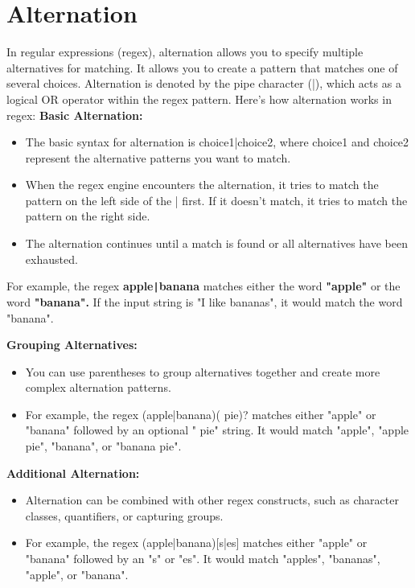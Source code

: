 \documentclass{report}
\begin{document}
    \section{Alternation}
    In regular expressions (regex), alternation allows you to specify multiple alternatives for matching. It allows you to create a pattern that matches one of several choices. Alternation is denoted by the pipe character (|), which acts as a logical OR operator within the regex pattern.
    \bigbreak \noindent 
    Here's how alternation works in regex:
    \bigbreak \noindent 
    \textbf{Basic Alternation:}
    \begin{itemize}
        \item The basic syntax for alternation is choice1|choice2, where choice1 and choice2 represent the alternative patterns you want to match.
        \item When the regex engine encounters the alternation, it tries to match the pattern on the left side of the | first. If it doesn't match, it tries to match the pattern on the right side.
        \item The alternation continues until a match is found or all alternatives have been exhausted.
    \end{itemize}
    \bigbreak \noindent 
    For example, the regex \textbf{apple\texttt{|}banana} matches either the word \textbf{"apple"} or the word \textbf{"banana".} If the input string is "I like bananas", it would match the word "banana".

    \bigbreak \noindent 
    \textbf{Grouping Alternatives:}
    \begin{itemize}
        \item You can use parentheses to group alternatives together and create more complex alternation patterns.
        \item For example, the regex (apple|banana)( pie)? matches either "apple" or "banana" followed by an optional " pie" string. It would match "apple", "apple pie", "banana", or "banana pie".
    \end{itemize}

    \bigbreak \noindent 
    \textbf{Additional Alternation:}
    \begin{itemize}
        \item Alternation can be combined with other regex constructs, such as character classes, quantifiers, or capturing groups.
        \item For example, the regex (apple|banana)[s|es] matches either "apple" or "banana" followed by an "s" or "es". It would match "apples", "bananas", "apple", or "banana".
    \end{itemize}
    \bigbreak \noindent 
\end{document}
